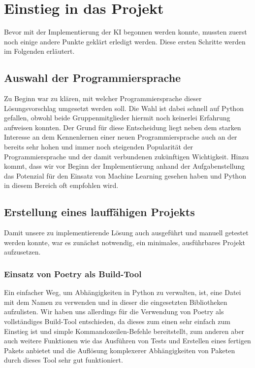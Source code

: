 \chapter{Einstieg in das Projekt}
\label{ch:planung}

Bevor mit der Implementierung der \ac{KI} begonnen werden konnte, mussten zuerst noch einige andere Punkte geklärt
\bzw erledigt werden.
Diese ersten Schritte werden im Folgenden erläutert.

\section{Auswahl der Programmiersprache}
\label{sec:auswahl-programmiersprache}

Zu Beginn war zu klären, mit welcher Programmiersprache dieser Lösungsvorschlag umgesetzt werden soll.
Die Wahl ist dabei schnell auf Python gefallen, obwohl beide Gruppenmitglieder hiermit noch keinerlei Erfahrung
aufweisen konnten.
Der Grund für diese Entscheidung liegt neben dem starken Interesse an dem Kennenlernen einer neuen Programmiersprache
auch an der bereits sehr hohen und immer noch steigenden Popularität der Programmiersprache und der damit verbundenen
zukünftigen Wichtigkeit.  
Hinzu kommt, dass wir vor Beginn der Implementierung anhand der Aufgabenstellung das Potenzial für den Einsatz von
Machine Learning gesehen haben und Python in diesem Bereich oft empfohlen wird.  

\section{Erstellung eines lauffähigen Projekts}
\label{sec:erstellung-projekt}

Damit unsere zu implementierende Lösung auch ausgeführt und manuell getestet werden konnte, war es zunächst notwendig,
ein minimales, ausführbares Projekt aufzusetzen.

\subsection{Einsatz von Poetry als Build-Tool}
\label{subsec:poetry}

Ein einfacher Weg, um Abhängigkeiten in Python zu verwalten, ist, eine Datei mit dem Namen  zu
verwenden und in dieser die eingesetzten Bibliotheken aufzulisten. 
Wir haben uns allerdings für die Verwendung von Poetry als vollständiges Build-Tool entschieden, da dieses zum einen
sehr einfach zum Einstieg ist und simple Kommandozeilen-Befehle bereitstellt, zum anderen aber auch weitere Funktionen
wie das Ausführen von Tests und Erstellen eines fertigen Pakets anbietet und die Auflösung komplexerer Abhängigkeiten
von Paketen durch dieses Tool sehr gut funktioniert. 

